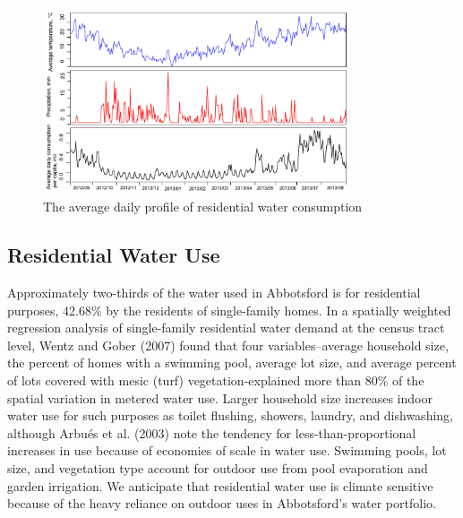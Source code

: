 \documentclass{sig-alternate}
\begin{document}
\begin{figure}[htp]
\centering
\includegraphics[width=0.8\textwidth]{images/weathervariableinwaterdemand}
\caption{The average daily profile of residential water consumption}
\label{fig:dailyprofile}
\end{figure}




\subsection{Residential Water Use}
Approximately two-thirds of the water used in Abbotsford is for residential purposes, 42.68\% by the residents of single-family homes. In a spatially weighted regression analysis of single-family residential water demand at the census tract level, Wentz and Gober (2007) found that four variables--average household size, the percent of homes with a swimming pool, average lot size, and average percent of lots covered with mesic (turf) vegetation-explained more than 80\% of the spatial variation in metered water use. Larger household size increases indoor water use for such purposes as toilet flushing, showers, laundry, and dishwashing, although Arbu\'{e}s et al. (2003) note the tendency for less-than-proportional increases in use because of economies of
scale in water use. Swimming pools, lot size, and vegetation type account for outdoor use from pool evaporation and garden irrigation. We anticipate that residential water use is climate sensitive because of the
heavy reliance on outdoor uses in Abbotsford's water portfolio.

\end{document}
